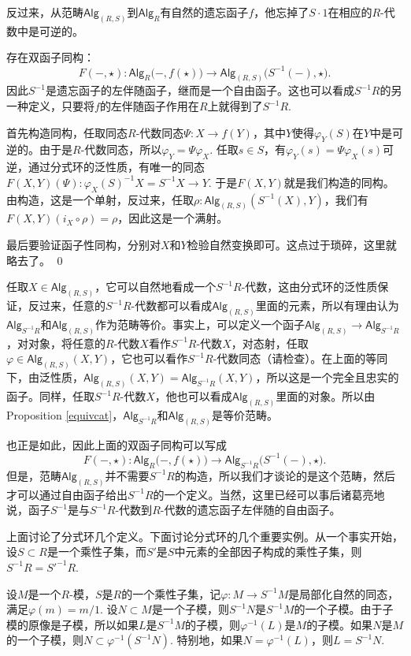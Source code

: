 反过来，从范畴$\mathsf{Alg}_{(R,S)}$到$\mathsf{Alg}_R$有自然的遗忘函子$f$，他忘掉了$S\cdot 1$在相应的$R$-代数中是可逆的。

\theo 存在双函子同构：
\[
	F(-,\star):\mathsf{Alg}_R\bigl(-,f(\star)\bigr)\to \mathsf{Alg}_{(R,S)}\bigl(S^{-1}(-),\star\bigr).
\]
因此$S^{-1}$是遗忘函子的左伴随函子，继而是一个自由函子。这也可以看成$S^{-1}R$的另一种定义，只要将$f$的左伴随函子作用在$R$上就得到了$S^{-1}R$.

\proof
	首先构造同构，任取同态$R$-代数同态$\Psi:X\to f(Y)$，其中$Y$使得$\varphi_Y(S)$在$Y$中是可逆的。由于是$R$-代数同态，所以$\varphi_Y=\Psi\varphi_X$. 任取$s\in S$，有$\varphi_Y(s)=\Psi\varphi_X(s)$可逆，通过分式环的泛性质，有唯一的同态$F(X,Y)(\Psi):\varphi_X(S)^{-1}X=S^{-1}X\to Y$. 于是$F(X,Y)$就是我们构造的同构。由构造，这是一个单射，反过来，任取$\rho:\mathsf{Alg}_{(R,S)}(S^{-1}(X),Y)$，我们有$F(X,Y)(i_X\circ \rho)=\rho$，因此这是一个满射。

	最后要验证函子性同构，分别对$X$和$Y$检验自然变换即可。这点过于琐碎，这里就略去了。
\qed

任取$X\in \mathsf{Alg}_{(R,S)}$，它可以自然地看成一个$S^{-1}R$-代数，这由分式环的泛性质保证，反过来，任意的$S^{-1}R$-代数都可以看成$\mathsf{Alg}_{(R,S)}$里面的元素，所以有理由认为$\mathsf{Alg}_{S^{-1}R}$和$\mathsf{Alg}_{(R,S)}$作为范畴等价。事实上，可以定义一个函子$\mathsf{Alg}_{(R,S)}\to \mathsf{Alg}_{S^{-1}R}$，对对象，将任意的$R$-代数$X$看作$S^{-1}R$-代数$X$，对态射，任取$\varphi\in \mathsf{Alg}_{(R,S)}(X,Y)$，它也可以看作$S^{-1}R$-代数同态（请检查）。在上面的等同下，由泛性质，$\mathsf{Alg}_{(R,S)}(X,Y)=\mathsf{Alg}_{S^{-1}R}(X,Y)$，所以这是一个完全且忠实的函子。同样，任取$S^{-1}R$-代数$X$，他也可以看成$\mathsf{Alg}_{(R,S)}$里面的对象。所以由Proposition \eqref{equivcat}，$\mathsf{Alg}_{S^{-1}R}$和$\mathsf{Alg}_{(R,S)}$是等价范畴。

也正是如此，因此上面的双函子同构可以写成
\[
	F(-,\star):\mathsf{Alg}_R\bigl(-,f(\star)\bigr)\to \mathsf{Alg}_{S^{-1}R}\bigl(S^{-1}(-),\star\bigr).
\]
但是，范畴$\mathsf{Alg}_{(R,S)}$并不需要$S^{-1}R$的构造，所以我们才谈论的是这个范畴，然后才可以通过自由函子给出$S^{-1}R$的一个定义。当然，这里已经可以事后诸葛亮地说，函子$S^{-1}$是与$S^{-1}R$-代数到$R$-代数的遗忘函子左伴随的自由函子。

\para 上面讨论了分式环几个定义。下面讨论分式环的几个重要实例。从一个事实开始，设$S\subset R$是一个乘性子集，而$S'$是$S$中元素的全部因子构成的乘性子集，则$S^{-1}R=S'^{-1}R$.

\para 设$M$是一个$R$-模，$S$是$R$的一个乘性子集，记$\varphi:M\to S^{-1}M$是局部化自然的同态，满足$\varphi(m)=m/1$. 设$N\subset M$是一个子模，则$S^{-1}N$是$S^{-1}M$的一个子模。由于子模的原像是子模，所以如果$L$是$S^{-1}M$的子模，则$\varphi^{-1}(L)$是$M$的子模。如果$N$是$M$的一个子模，则$N\subset \varphi^{-1}(S^{-1}N)$. 特别地，如果$N=\varphi^{-1}(L)$，则$L=S^{-1}N$.

